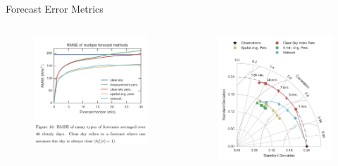 \documentclass[aspectratio=169]{beamer}
\begin{document}
\begin{frame}{Forecast Error Metrics}
\begin{columns}
\begin{column}{0.4\textwidth}
\begin{figure}[h]
  \includegraphics[width=\textwidth]{figs/network_rmse.png}
\end{figure}
\end{column}
\begin{column}{0.3\textwidth}
\begin{figure}[h]
  \includegraphics[height=.6\textheight]{figs/old_taylor.png}

\end{figure}
\end{column}
\end{columns}
\end{frame}
\end{document}

